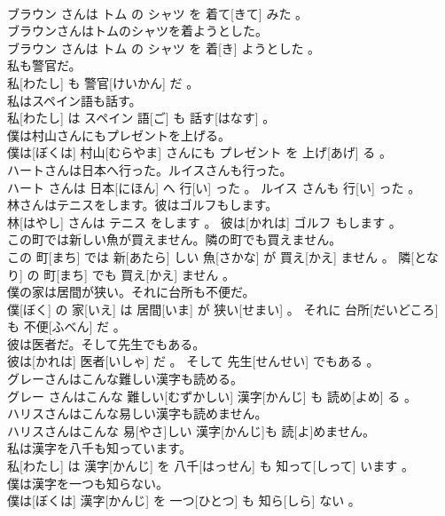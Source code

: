 \documentclass[8pt]{extreport}
\begin{document}
\begin{CJK}{UTF8}{min}
\\	ブラウン さんは トム の シャツ を 着て[きて] みた 。
\\	ブラウンさんはトムのシャツを着ようとした。	
\\	ブラウン さんは トム の シャツ を 着[き] ようとした 。
\\	私も警官だ。	
\\	私[わたし] も 警官[けいかん] だ 。
\\	私はスペイン語も話す。	
\\	私[わたし] は スペイン 語[ご] も 話す[はなす] 。
\\	僕は村山さんにもプレゼントを上げる。	
\\	僕は[ぼくは] 村山[むらやま] さんにも プレゼント を 上げ[あげ] る 。
\\	ハートさんは日本へ行った。ルイスさんも行った。	
\\	ハート さんは 日本[にほん] へ 行[い] った 。 ルイス さんも 行[い] った 。
\\	林さんはテニスをします。彼はゴルフもします。	
\\	林[はやし] さんは テニス をします 。 彼は[かれは] ゴルフ もします 。
\\	この町では新しい魚が買えません。隣の町でも買えません。	
\\	この 町[まち] では 新[あたら] しい 魚[さかな] が 買え[かえ] ません 。 隣[となり] の 町[まち] でも 買え[かえ] ません 。
\\	僕の家は居間が狭い。それに台所も不便だ。	
\\	僕[ぼく] の 家[いえ] は 居間[いま] が 狭い[せまい] 。 それに 台所[だいどころ] も 不便[ふべん] だ 。
\\	彼は医者だ。そして先生でもある。	
\\	彼は[かれは] 医者[いしゃ] だ 。 そして 先生[せんせい] でもある 。
\\	グレーさんはこんな難しい漢字も読める。	
\\	グレー さんはこんな 難しい[むずかしい] 漢字[かんじ] も 読め[よめ] る 。
\\	ハリスさんはこんな易しい漢字も読めません。	
\\	ハリスさんはこんな 易[やさ]しい 漢字[かんじ]も 読[よ]めません。
\\	私は漢字を八千も知っています。	
\\	私[わたし] は 漢字[かんじ] を 八千[はっせん] も 知って[しって] います 。
\\	僕は漢字を一つも知らない。	
\\	僕は[ぼくは] 漢字[かんじ] を 一つ[ひとつ] も 知ら[しら] ない 。

\end{CJK}
\end{document}
